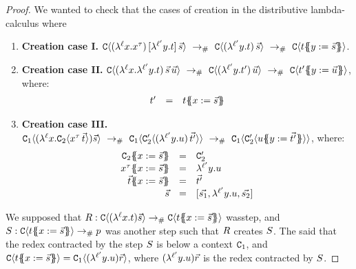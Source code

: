 
\begin{proof}
We wanted to check that the cases of creation in the distributive lambda-calculus where
\begin{enumerate}
\item {\bf Creation case I.}
  $
    \con\of{ (\lamp{\lab}{\var}{\var^{\typ}})\,[\lamp{\labtwo}{\vartwo}{\tm}]\, \ls{\tmtwo}}
    \ \todist\ %
    \con\of{ (\lamp{\labtwo}{\vartwo}{\tm})\,\ls{\tmtwo} }
    \ \todist\ %
    \con\of{ \tm\sub{\vartwo}{\ls{\tmtwo}} }
  $.
\item {\bf Creation case II.}
  $
     \con\of{ (\lamp{\lab}{\var}{ \lamp{\labtwo}{\vartwo}{\tm} })\,\ls{\tmtwo}\,\ls{\tmthree} }
     \ \todist\ %
     \con\of{ (\lamp{\labtwo}{\vartwo}{\tm'})\,\ls{\tmthree} }
     \ \todist\ %
     \con\of{ \tm'\sub{\vartwo}{\ls{\tmthree}} }
  $, where:
  \[
     \begin{array}{rcl}
     t' & = & t\{\!\!\{x := \vec{s}\}\!\!\}
     \end{array}
  \]
\item {\bf Creation case III.}
  $
    \con_1\of{(\lamp{\lab}{\var}{\con_2\of{\var^{\typ}\,\ls{\tm}}})\ls{\tmtwo}}
    \ \todist\ %
    \con_1\of{\con'_2\of{(\lamp{\labtwo}{\vartwo}{\tmthree})\,\ls{\tm'}}}
    \ \todist\ %
    \con_1\of{\con'_2\of{\tmthree\sub{\vartwo}{\ls{\tm'}}}}
  $,
  where:
  \[
  \begin{array}{rcl}
    \con_2\sub{\var}{\ls{\tmtwo}}      & = & \con'_2 \\
    \var^{\typ}\sub{\var}{\ls{\tmtwo}} & = & \lamp{\labtwo}{\vartwo}{\tmthree} \\
    \ls{\tm}\sub{\var}{\ls{\tmtwo}}    & = & \ls{\tm'} \\
    \ls{\tmtwo}                        & = & [\ls{\tmtwo_1},\lamp{\labtwo}{\vartwo}{\tmthree},\ls{\tmtwo_2}] \\
  \end{array}
  \]
\end{enumerate}

We supposed that $R : \mathtt{C}\langle(\lambda^{\ell} x. t)\vec{s}\rangle \mathrel{\to_{\mathtt{\#}}} \mathtt{C}\langle t\{\!\!\{x := \vec{s}\}\!\!\}\rangle$ wasstep,
and $S : \mathtt{C}\langle t\{\!\!\{x := \vec{s}\}\!\!\}\rangle \mathrel{\to_{\mathtt{\#}}} p$ was another step
such that $R$ creates $S$.
The said that the redex contracted by the step $S$ is below a context $\mathtt{C}_1$,
and $\mathtt{C}\langle t\{\!\!\{x := \vec{s}\}\!\!\}\rangle = \mathtt{C}_1\langle(\lambda^{\ell'} y. u)\vec{r}\rangle$,
where $(\lambda^{\ell'} y. u)\vec{r}$ is the redex contracted by $S$.



\end{proof}
